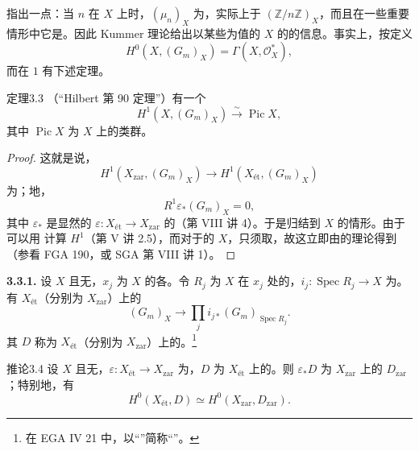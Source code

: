 指出一点：当 $n$ 在 $X$ 上时，$(\mu_n)_X$ 为，实际上于 $(\mathbb Z/n\mathbb Z)_X$，而且在一些重要情形中它是。因此 Kummer 理论给出以某些为值的 $X$ 的的信息。事实上，按定义
\[
H^0(X,(G_m)_X)=\Gamma(X,\mathcal O_X^*),
\]
而在 $1$ 有下述定理。
\begin{SGAresult}{定理}{3.3}
（“Hilbert 第 90 定理”）有一个
\[
H^1(X,(G_m)_X)\xrightarrow{\sim}\operatorname{Pic}X,
\]
其中 $\operatorname{Pic}X$ 为 $X$ 上的类群。
\end{SGAresult}
\begin{proof}
这就是说，
\[
H^1(X_{\mathrm{zar}},(G_m)_X)\longrightarrow H^1(X_{\text{ét}},(G_m)_X)
\]
为；地，
\[
R^1\varepsilon_*(G_m)_X=0,
\]
其中 $\varepsilon_*$ 是显然的 $\varepsilon:X_{\text{ét}}\to X_{\mathrm{zar}}$ 的（第 VIII 讲 4）。于是归结到 $X$ 的情形。由于可以用 计算 $H^1$（第 V 讲 2.5），而对于的 $X$，只须取，故这立即由的理论得到（参看 FGA 190，或 SGA 第 VIII 讲 1）。
\end{proof}
\textbf{3.3.1.} 设 $X$ 且无，$x_j$ 为 $X$ 的各。令 $R_j$ 为 $X$ 在 $x_j$ 处的，$i_j:\operatorname{Spec}R_j\to X$ 为。有 $X_{\text{ét}}$（分别为 $X_{\mathrm{zar}}$）上的
\[
(G_m)_X\longrightarrow\prod_ji_{j*}(G_m)_{\operatorname{Spec}R_j}.
\]
其 $D$ 称为 $X_{\text{ét}}$（分别为 $X_{\mathrm{zar}}$）上的。\footnote{在 EGA IV 21 中，以“”简称“”。}
\begin{SGAresult}{推论}{3.4}
设 $X$ 且无，$\varepsilon:X_{\text{ét}}\to X_{\mathrm{zar}}$ 为，$D$ 为 $X_{\text{ét}}$ 上的。则 $\varepsilon_*D$ 为 $X_{\mathrm{zar}}$ 上的 $D_{\mathrm{zar}}$；特别地，有
\[
H^0(X_{\text{ét}},D)\simeq H^0(X_{\mathrm{zar}},D_{\mathrm{zar}}).
\]
\end{SGAresult}
